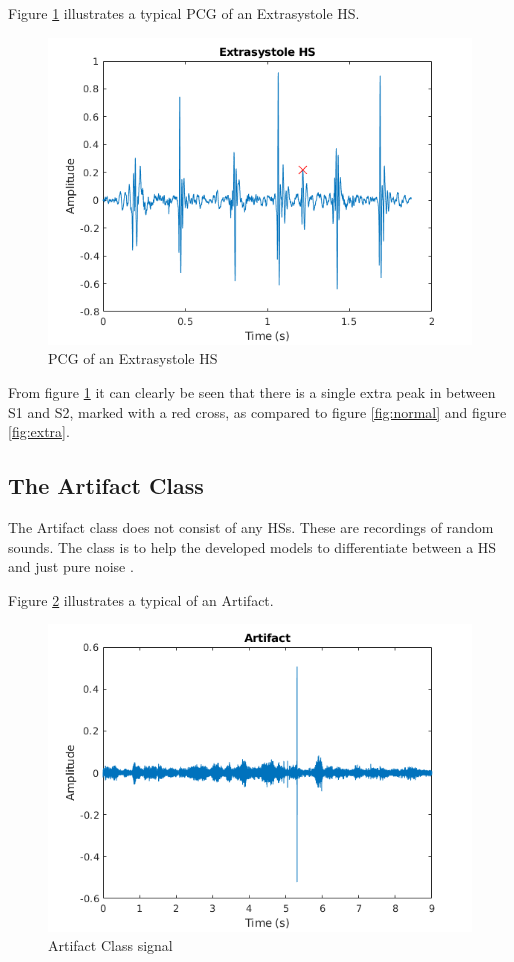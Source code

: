 \documentclass[10pt,twocolumn]{witseiepaper}
\begin{document}
Figure \ref{fig:extrasys} illustrates a typical PCG of an Extrasystole HS.
\begin{figure}[h!]
    \centering
    \includegraphics[scale = 0.45]{./extrasys.png}
    \caption{PCG of an Extrasystole HS}
    \label{fig:extrasys}
\end{figure}{}

From figure \ref{fig:extrasys} it can clearly be seen that there is a single extra peak in between S1 and S2, marked with a red cross, as compared to figure \ref{fig:normal} and figure \ref{fig:extra}.

\subsection*{The Artifact Class}
\label{sec:arti}
The Artifact class does not consist of any HSs. These are recordings of random sounds. The class is to help the developed models to differentiate between a HS and just pure noise \cite{bentley}.

Figure \ref{fig:arti} illustrates a typical of an Artifact.
\begin{figure}[h!]
    \centering
    \includegraphics[scale = 0.45]{./arti.png}
    \caption{Artifact Class signal}
    \label{fig:arti}
\end{figure}{}
\end{document}
